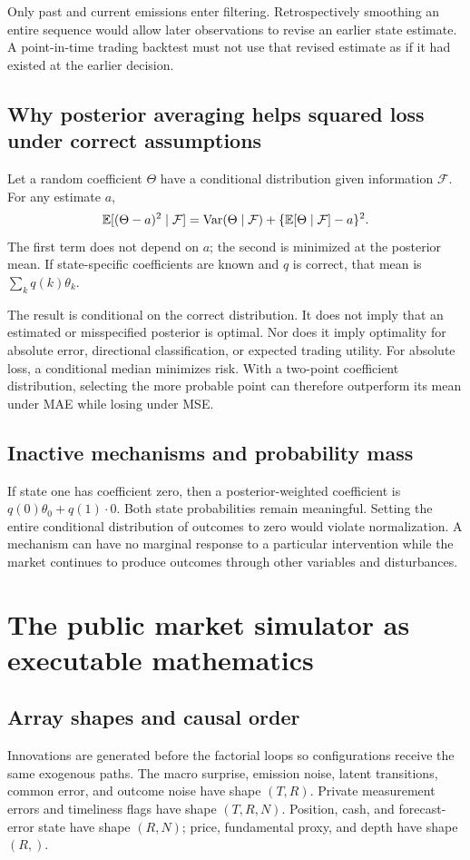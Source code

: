 Only past and current emissions enter filtering. Retrospectively smoothing an entire sequence would allow later observations to revise an earlier state estimate. A point-in-time trading backtest must not use that revised estimate as if it had existed at the earlier decision.

\subsection{Why posterior averaging helps squared loss under correct assumptions}
Let a random coefficient $\Theta$ have a conditional distribution given information $\mathcal F$. For any estimate $a$,
\[
\mathbb E[(\Theta-a)^2\mid\mathcal F]
=\operatorname{Var}(\Theta\mid\mathcal F)
+\{\mathbb E[\Theta\mid\mathcal F]-a\}^2.
\]
The first term does not depend on $a$; the second is minimized at the posterior mean. If state-specific coefficients are known and $q$ is correct, that mean is $\sum_k q(k)\theta_k$.

The result is conditional on the correct distribution. It does not imply that an estimated or misspecified posterior is optimal. Nor does it imply optimality for absolute error, directional classification, or expected trading utility. For absolute loss, a conditional median minimizes risk. With a two-point coefficient distribution, selecting the more probable point can therefore outperform its mean under MAE while losing under MSE.

\subsection{Inactive mechanisms and probability mass}
If state one has coefficient zero, then a posterior-weighted coefficient is $q(0)\theta_0+q(1)\cdot0$. Both state probabilities remain meaningful. Setting the entire conditional distribution of outcomes to zero would violate normalization. A mechanism can have no marginal response to a particular intervention while the market continues to produce outcomes through other variables and disturbances.

\section{The public market simulator as executable mathematics}
\subsection{Array shapes and causal order}
Innovations are generated before the factorial loops so configurations receive the same exogenous paths. The macro surprise, emission noise, latent transitions, common error, and outcome noise have shape $(T,R)$. Private measurement errors and timeliness flags have shape $(T,R,N)$. Position, cash, and forecast-error state have shape $(R,N)$; price, fundamental proxy, and depth have shape $(R,)$.

